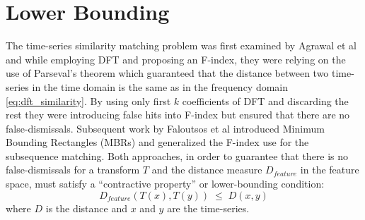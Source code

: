 \section{Lower Bounding}
The time-series similarity matching problem was first examined by Agrawal et al \cite{citeulike:3973409} and while employing DFT and proposing an F-index, they were relying on the use of Parseval's theorem which guaranteed that the distance between two time-series in the time domain is the same as in the frequency domain \ref{eq:dft_similarity}. By using only first $k$ coefficients of DFT and discarding the rest they were introducing false hits into F-index but ensured that there are no false-dismissals. Subsequent work by Faloutsos et al \cite{citeulike:825581} introduced Minimum Bounding Rectangles (MBRs) and generalized the F-index use for the subsequence matching. Both approaches, in order to guarantee that there is no false-dismissals for a transform $T$ and the distance measure $D_{feature}$ in the feature space, must satisfy a ``contractive property'' or lower-bounding condition:
\begin{equation}
D_{feature}(T(x),T(y)) \; \leq \; D(x,y) 
\label{eq:bounding}
\end{equation}
where $D$ is the distance and $x$ and $y$ are the time-series.